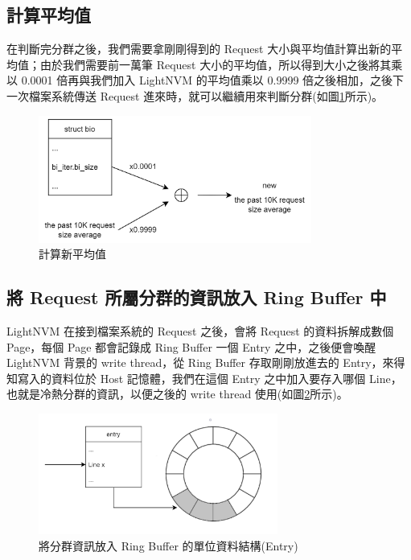 \subsection{計算平均值}\label{s3.2.3}
\indent
在判斷完分群之後，我們需要拿剛剛得到的 Request 大小與平均值計算出新的平均值；由於我們需要前一萬筆 Request 大小的平均值，所以得到大小之後將其乘以 0.0001 倍再與我們加入 LightNVM 的平均值乘以 0.9999 倍之後相加，之後下一次檔案系統傳送 Request 進來時，就可以繼續用來判斷分群(如圖\ref{f3.7}所示)。
\begin{figure}[H]
    \centering
    \includegraphics[width=0.8\textwidth]{picture/ch3/new_average.png}
    \caption{計算新平均值}
    \label{f3.7}
\end{figure}

\subsection{將 Request 所屬分群的資訊放入 Ring Buffer 中}\label{s3.2.4}
\indent
LightNVM 在接到檔案系統的 Request 之後，會將 Request 的資料拆解成數個 Page，每個 Page 都會記錄成 Ring Buffer 一個 Entry 之中，之後便會喚醒 LightNVM 背景的 write thread，從 Ring Buffer 存取剛剛放進去的 Entry，來得知寫入的資料位於 Host 記憶體，我們在這個 Entry 之中加入要存入哪個 Line，也就是冷熱分群的資訊，以便之後的 write thread 使用(如圖\ref{f3.8}所示)。

\begin{figure}[H]
    \centering
    \includegraphics[width=0.7\textwidth]{picture/ch3/store_line_in_ring_buffer_entry.png}
    \caption{將分群資訊放入 Ring Buffer 的單位資料結構(Entry)}
    \label{f3.8}
\end{figure}

